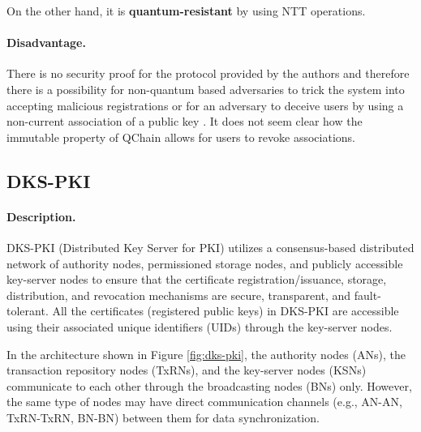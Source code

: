 \documentclass[lang=en]{sjtuarticle}
\begin{document}
On the other hand, it is \textbf{quantum-resistant} by using NTT operations.

\paragraph{Disadvantage.} There is no security proof for the protocol provided by the authors and therefore there is a possibility for non-quantum based adversaries to trick the system into accepting malicious
registrations or for an adversary to deceive users by using a non-current association of a public key \cite{dpkisota}. It does not seem clear how the immutable property of QChain allows for users to revoke associations. 

\subsection{DKS-PKI}

\paragraph{Description.}

DKS-PKI (Distributed Key Server for PKI) \cite{Faisal2022} utilizes a consensus-based distributed network of authority nodes, permissioned
storage nodes, and publicly accessible key-server nodes to ensure
that the certificate registration/issuance, storage, distribution, and revocation
mechanisms are secure, transparent, and fault-tolerant. All the certificates
(registered public keys) in DKS-PKI are accessible using their associated
unique identifiers (UIDs) through the key-server nodes.


In the architecture shown in Figure \ref{fig:dks-pki}, the authority nodes (ANs), the transaction repository
nodes (TxRNs), and the key-server nodes (KSNs) communicate to each
other through the broadcasting nodes (BNs) only. However, the same type of
nodes may have direct communication channels (e.g., AN-AN, TxRN-TxRN,
BN-BN) between them for data synchronization.
\end{document}
